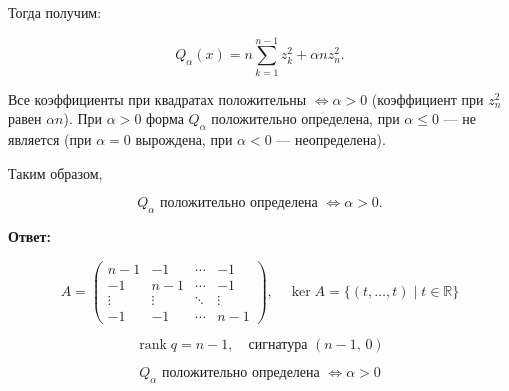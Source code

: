 \documentclass[12pt,final,oneside]{extreport}%
\begin{document}
Тогда получим:

\[
Q_\alpha(x) = n\sum_{k=1}^{n-1} z_k^2 + \alpha n z_n^2.
\]

Все коэффициенты при квадратах положительны $\iff \alpha > 0$ (коэффициент при $z_n^2$ равен $\alpha n$). При $\alpha > 0$ форма $Q_\alpha$ положительно определена, при $\alpha \le 0$ — не является (при $\alpha=0$ вырождена, при $\alpha<0$ — неопределена).

Таким образом,

\[
Q_\alpha \text{ положительно определена } \iff \alpha > 0.
\]

\textbf{Ответ:}

\[
\boxed{A = \begin{pmatrix}
n-1 & -1 & \cdots & -1 \\
-1 & n-1 & \cdots & -1 \\
\vdots & \vdots & \ddots & \vdots \\
-1 & -1 & \cdots & n-1
\end{pmatrix}, \quad \ker A = \{(t,\dots,t) \mid t\in\mathbb{R}\}}
\]
 
\[
\boxed{\operatorname{rank} q = n-1,\quad \text{сигнатура } (n-1,\, 0)}
\]
 
\[
\boxed{Q_\alpha \text{ положительно определена } \iff \alpha > 0}
\]
\end{document}
